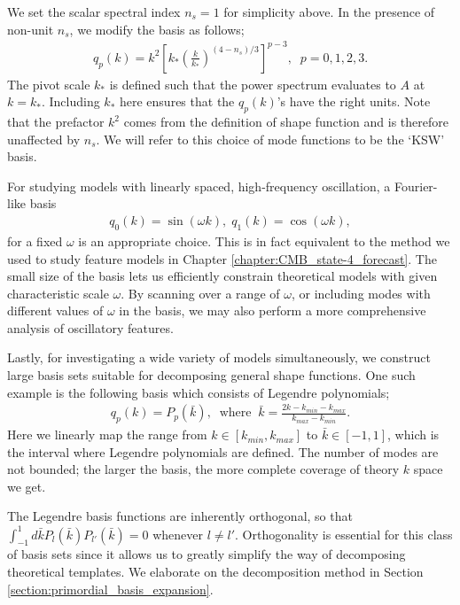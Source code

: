 We set the scalar spectral index $n_s = 1$ for simplicity above. In the presence of non-unit $n_s$, we modify the basis as follows;
\begin{align}
	q_p(k) = k^2 \left[ k_* \left( \frac{k}{k_*} \right)^{(4-n_s)/3} \right]^{p-3}, \;\; p=0,1,2,3. \label{eqn:KSW_basis}
\end{align}
The pivot scale $k_*$ is defined such that the power spectrum evaluates to $A$ at $k=k_*$. Including $k_*$ here ensures that the $q_p(k)$'s have the right units. Note that the prefactor $k^2$ comes from the definition of shape function and is therefore unaffected by $n_s$. We will refer to this choice of mode functions to be the `KSW' basis.

For studying models with linearly spaced, high-frequency oscillation, a Fourier-like basis
\begin{align}
	q_0(k) = \sin (\omega k), \; q_1(k) = \cos (\omega k), \label{eqn:Fourier_basis}
\end{align}
for a fixed $\omega$ is an appropriate choice. This is in fact equivalent to the method we used to study feature models in Chapter \ref{chapter:CMB_state-4_forecast}. The small size of the basis lets us efficiently constrain theoretical models with given characteristic scale $\omega$. By scanning over a range of $\omega$, or including modes with different values of $\omega$ in the basis, we may also perform a more comprehensive analysis of oscillatory features.

Lastly, for investigating a wide variety of models simultaneously, we construct large basis sets suitable for decomposing general shape functions. One such example is the following basis which consists of Legendre polynomials;
\begin{align}
	q_p(k) = P_p(\bar{k}), \;\;\text{where}\;\; \bar{k} = \frac{2k-k_{min}-k_{max}}{k_{max}-k_{min}}.  \label{eqn:Legendre_basis_no_inv_k}
\end{align}
Here we linearly map the range from $k \in [k_{min},k_{max}]$ to $\bar{k} \in [-1,1]$, which is the interval where Legendre polynomials are defined. The number of modes are not bounded; the larger the basis, the more complete coverage of theory $k$ space we get.

The Legendre basis functions are inherently orthogonal, so that $\int_{-1}^{1} d\bar{k} P_{l}(\bar{k}) P_{l'}(\bar{k}) = 0$ whenever $l \neq l'$. Orthogonality is essential for this class of basis sets since it allows us to greatly simplify the way of decomposing theoretical templates. We elaborate on the decomposition method in Section \ref{section:primordial_basis_expansion}. 

